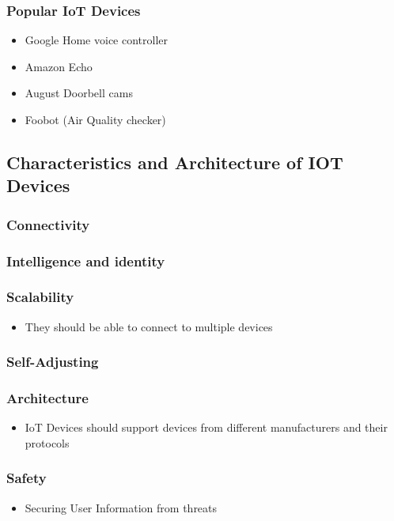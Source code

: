 \documentclass[11pt]{article}
\begin{document}
\subsubsection{Popular IoT Devices}
\label{sec:org6fae521}

\begin{itemize}
\item Google Home voice controller
\item Amazon Echo
\item August Doorbell cams
\item Foobot (Air Quality checker)
\end{itemize}

\subsection{Characteristics and Architecture of IOT Devices}
\label{sec:orga1b23dc}

\subsubsection{Connectivity}
\label{sec:org0bd6546}
\subsubsection{Intelligence and identity}
\label{sec:org833958c}
\subsubsection{Scalability}
\label{sec:orga0a1f38}
\begin{itemize}
\item They should be able to connect to multiple devices
\end{itemize}
\subsubsection{Self-Adjusting}
\label{sec:orgfd53279}
\subsubsection{Architecture}
\label{sec:org32628a5}
\begin{itemize}
\item IoT Devices should support devices from different manufacturers and their protocols
\end{itemize}
\subsubsection{Safety}
\label{sec:org852fb8e}
\begin{itemize}
\item Securing User Information from threats
\end{itemize}
\end{document}
